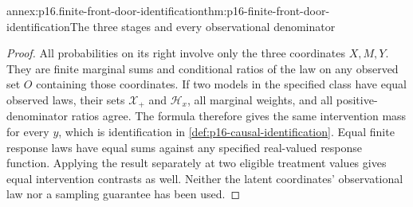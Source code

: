 \begin{annexitem}{annex:p16.finite-front-door-identification}{thm:p16-finite-front-door-identification}{The three stages and every observational denominator}
\begin{proof}
All probabilities on its right involve only the three coordinates
\(X,M,Y\). They are finite marginal sums and conditional ratios
of the law on any observed set \(O\) containing those coordinates.
If two models in the specified class have equal observed laws, their
sets \(\mathcal X_+\) and \(\mathcal H_x\), all marginal
weights, and all positive-denominator ratios agree. The formula
therefore gives the same intervention mass for every \(y\), which
is identification in \cref{def:p16-causal-identification}.
Equal finite response laws have equal sums against any specified
real-valued response function. Applying the result separately at two
eligible treatment values gives equal intervention contrasts as well.
Neither the latent coordinates' observational law nor a sampling
guarantee has been used.
\end{proof}
\end{annexitem}

